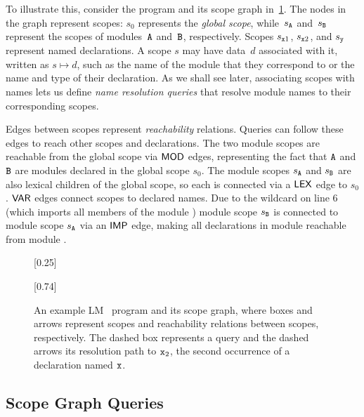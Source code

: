 To illustrate this, consider the program and its scope graph in~\cref{fig:scope-graph-example}.
The nodes in the graph represent scopes: $s_0$ represents the \emph{global scope}, while~$s_{\texttt{A}}$ and~$s_{\texttt{B}}$ represent the scopes of modules~$\texttt{A}$ and~$\texttt{B}$, respectively.
Scopes $s_{\texttt{x}1}$, $s_{\texttt{x}2}$, and $s_{\texttt{y}}$ represent named declarations.
A scope $s$ may have data~$d$ associated with it, written as $s \mapsto d$, such as the name of the module that they correspond to or the name and type of their declaration.
As we shall see later, associating scopes with names lets us define \emph{name resolution queries} that resolve module names to their corresponding scopes.

Edges between scopes represent \emph{reachability} relations.
Queries can follow these edges to reach other scopes and declarations.
The two module scopes are reachable from the global scope via $\mathsf{MOD}$ edges, representing the fact that $\texttt{A}$ and $\texttt{B}$ are modules declared in the global scope $s_0$.
The module scopes $s_{\texttt{A}}$ and $s_{\texttt{B}}$ are also lexical children of the global scope, so each is connected via a $\mathsf{LEX}$ edge to $s_0$.
$\mathsf{VAR}$ edges connect scopes to declared names.
Due to the wildcard  on line 6 (which imports all members of the module ) module scope $s_{\texttt{B}}$ is connected to module scope $s_{\texttt{A}}$ via an $\mathsf{IMP}$ edge, making all declarations in module  reachable from module .

\begin{figure}
  [0.25\textwidth]{
    
  }%
  \hfill
  [0.74\textwidth]{
    
  }%
  \caption{
    An example LM~\cite{NeronTVW15} program and its scope graph, where boxes and arrows represent scopes and reachability relations between scopes, respectively.
    The {\color{colorblind-bright-3}dashed box} represents a query and the {\color{colorblind-bright-3}dashed arrows} its resolution path to $\texttt{x}_{2}$, the second occurrence of a declaration named $\texttt{x}$.
  }%
  \label{fig:scope-graph-example}
\end{figure}





\subsection{Scope Graph Queries}%
\label{subsec:scope-graph-queries}

